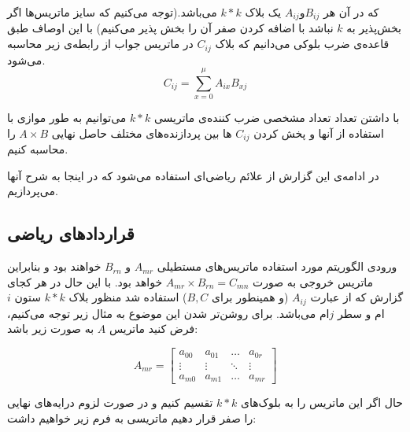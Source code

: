 \documentclass[12pt,onecolumn,a4paper,fleqn]{article}
\begin{document}
	که در آن هر $A_{ij} و B_{ij}$ یک بلاک $k*k$ می‌باشد.(توجه می‌کنیم که  سایز‌ ماتریس‌ها اگر بخش‌‌پذیر به $k$ نباشد با اضافه‌ کردن صفر آن را بخش پذیر می‌کنیم) با این اوصاف طبق قاعده‌ی ضرب بلوکی می‌دانیم که بلاک $C_{ij}$ در ماتریس جواب از رابطه‌ی زیر محاسبه می‌شود.
	\begin{equation}
	C_{ij} = \sum_{x=0}^\mu A_{ix}B_{xj}
	\label{1}
	\end{equation}
	
	با داشتن تعداد تعداد مشخصی ضرب کننده‌ی ماتریسی $k*k$ می‌توانیم  به طور موازی با استفاده از آنها  و پخش ‌کردن $C_{ij}$ ها بین پردازنده‌های مختلف حاصل نهایی $A\times B$ را محاسبه کنیم. 

در ادامه‌ی این گزارش از علائم ریاضی‌ای استفاده می‌شود که در اینجا به شرح‌ آنها می‌پردازیم.
	
\pagebreak

\subsection{قرارداد‌های ریاضی}

ورودی الگوریتم مورد استفاده  ماتریس‌های مستطیلی $A_{mr}$ و $B_{rn}$ خواهند بود و بنابراین ماتریس‌ خروجی به صورت
$A_{mr} \times B_{rn} = C_{mn}$
خواهد بود. با این‌ حال در هر کجای گزارش که از عبارت $A_{ij}$ (و همینطور برای $B,C$) استفاده شد منظور بلاک‌ $k*k$ ستون $i$ام و سطر $j$ام می‌باشد. برای روشن‌تر شدن این موضوع به مثال زیر توجه می‌کنیم، فرض کنید ماتریس $A$ به صورت زیر باشد:

	$$ A_{mr} = \begin{bmatrix}
	a_{00}& a_{01}& \dots& a_{0r}\\
	\vdots& \vdots& \ddots& \vdots\\
	a_{m0}& a_{m1}& \dots& a_{mr}
	\end{bmatrix} $$
	
	حال اگر این ماتریس را به بلوک‌های $k*k$ تقسیم کنیم و در صورت لزوم درایه‌های نهایی را صفر قرار دهیم ماتریسی به فرم زیر خواهیم داشت:
	
\end{document}
